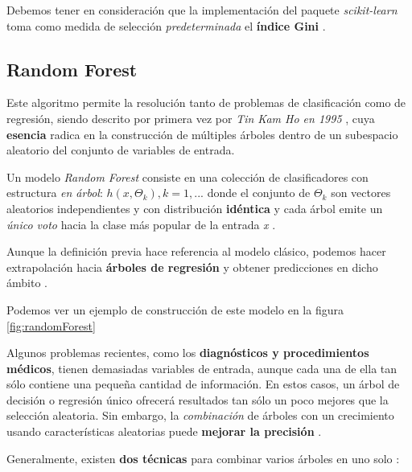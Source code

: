 Debemos tener en consideración que la implementación del paquete \textit{scikit-learn} toma como medida de selección \textit{predeterminada} el \textbf{índice Gini} \cite{Pedregosa2011Scikit-learn:Python}.


\subsection{Random Forest}

Este algoritmo permite la resolución tanto de problemas de clasificación como de regresión, siendo descrito por primera vez por \textit{Tin Kam Ho en 1995}  \cite{Ho1995RandomForests}, cuya \textbf{esencia} radica en la construcción de múltiples árboles dentro de un subespacio aleatorio del conjunto de variables de entrada.

Un modelo \textit{Random Forest} consiste en una colección de clasificadores con estructura \textit{en árbol}: 
\({h(x,\Theta_{k}), k = 1, ...}\)
donde el conjunto de 
\(\Theta_{k}\) son vectores aleatorios independientes y con distribución \textbf{idéntica} y cada árbol emite un \textit{único voto} hacia la clase más popular de la entrada \textit{x} \cite{Breiman2001RandomForests}.

Aunque la definición previa hace referencia al modelo clásico, podemos hacer extrapolación hacia \textbf{árboles de regresión} y obtener predicciones en dicho ámbito  \cite{Belyadi2021SupervisedLearning}.

Podemos ver un ejemplo de construcción de este modelo en la figura \ref{fig:randomForest}


Algunos problemas recientes, como los \textbf{diagnósticos y procedimientos médicos}, tienen demasiadas variables de entrada, aunque cada una de ella tan sólo contiene una pequeña cantidad de información. En estos casos, un árbol de decisión o regresión único ofrecerá resultados tan sólo un poco mejores que la selección aleatoria. Sin embargo, la \textit{combinación} de árboles con un crecimiento usando características aleatorias puede \textbf{mejorar la precisión} \cite{Breiman2001RandomForests}.

Generalmente, existen \textbf{dos técnicas} para combinar varios árboles en uno solo \cite{Belyadi2021SupervisedLearning}:

